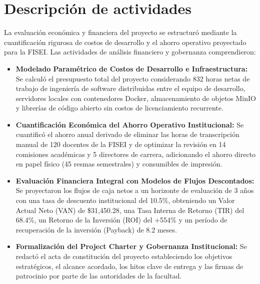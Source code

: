 \documentclass[12pt,a4paper]{article}
\begin{document}
\section{Descripción de actividades}
La evaluación económica y financiera del proyecto se estructuró mediante la cuantificación rigurosa de costos de desarrollo y el ahorro operativo proyectado para la FISEI. Las actividades de análisis financiero y gobernanza comprendieron:

\begin{itemize}[leftmargin=1.5em, itemsep=4pt]
    \item \textbf{Modelado Paramétrico de Costos de Desarrollo e Infraestructura:} Se calculó el presupuesto total del proyecto considerando 832 horas netas de trabajo de ingeniería de software distribuidas entre el equipo de desarrollo, servidores locales con contenedores Docker, almacenamiento de objetos MinIO y librerías de código abierto sin costos de licenciamiento recurrente.
    \item \textbf{Cuantificación Económica del Ahorro Operativo Institucional:} Se cuantificó el ahorro anual derivado de eliminar las horas de transcripción manual de 120 docentes de la FISEI y de optimizar la revisión en 14 comisiones académicas y 5 directores de carrera, adicionando el ahorro directo en papel físico (45 resmas semestrales) y consumibles de impresión.
    \item \textbf{Evaluación Financiera Integral con Modelos de Flujos Descontados:} Se proyectaron los flujos de caja netos a un horizonte de evaluación de 3 años con una tasa de descuento institucional del 10.5\%, obteniendo un Valor Actual Neto (VAN) de \$31,450.28, una Tasa Interna de Retorno (TIR) del 68.4\%, un Retorno de la Inversión (ROI) del +554\% y un período de recuperación de la inversión (Payback) de 8.2 meses.
    \item \textbf{Formalización del Project Charter y Gobernanza Institucional:} Se redactó el acta de constitución del proyecto estableciendo los objetivos estratégicos, el alcance acordado, los hitos clave de entrega y las firmas de patrocinio por parte de las autoridades de la facultad.
\end{itemize}
\end{document}
